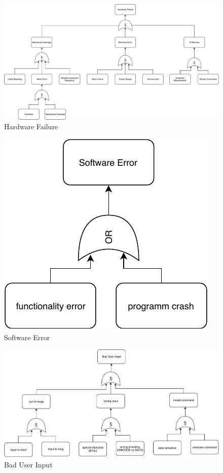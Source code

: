 \documentclass{beamer}
\begin{document}
\begin{frame}
	\begin{figure}[H]
		\centering
		\includegraphics[width=0.9\linewidth]{../faultTreeAnalysis/FaultTreeAnalysisHardware}
		\caption{Hardware Failure}
		\label{fig:faulttreeanalysishardware}
	\end{figure}
\end{frame}

\begin{frame}
	\begin{figure}[H]
		\centering
		\includegraphics[width=0.4\linewidth]{../faultTreeAnalysis/FaultTreeAnalysisSoftware}
		\caption{Software Error}
		\label{fig:faulttreeanalysissoftware}
	\end{figure}
\end{frame}

\begin{frame}
	\begin{figure}[H]
		\centering
		\includegraphics[width=0.8\linewidth]{../faultTreeAnalysis/FaultTreeAnalysisBadUserInput}
		\caption{Bad User Input}
		\label{fig:faulttreeanalysisbaduserinput}
	\end{figure}
	
\end{frame}
	
\end{document}
